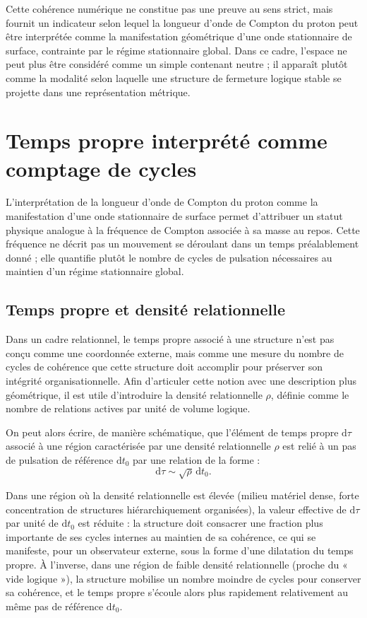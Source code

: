 \documentclass[11pt,a4paper]{article}
\begin{document}
Cette cohérence numérique ne constitue pas une preuve au sens strict, mais fournit un indicateur selon lequel la longueur d’onde de Compton du proton peut être interprétée comme la manifestation géométrique d’une onde stationnaire de surface, contrainte par le régime stationnaire global. Dans ce cadre, l’espace ne peut plus être considéré comme un simple contenant neutre ; il apparaît plutôt comme la modalité selon laquelle une structure de fermeture logique stable se projette dans une représentation métrique.

\section{Temps propre interprété comme comptage de cycles}

L’interprétation de la longueur d’onde de Compton du proton comme la manifestation d’une onde stationnaire de surface permet d’attribuer un statut physique analogue à la fréquence de Compton associée à sa masse au repos. Cette fréquence ne décrit pas un mouvement se déroulant dans un temps préalablement donné ; elle quantifie plutôt le nombre de cycles de pulsation nécessaires au maintien d’un régime stationnaire global.

\subsection{Temps propre et densité relationnelle}

Dans un cadre relationnel, le temps propre associé à une structure n’est pas conçu comme une coordonnée externe, mais comme une mesure du nombre de cycles de cohérence que cette structure doit accomplir pour préserver son intégrité organisationnelle. Afin d’articuler cette notion avec une description plus géométrique, il est utile d’introduire la densité relationnelle \(\rho\), définie comme le nombre de relations actives par unité de volume logique.

On peut alors écrire, de manière schématique, que l’élément de temps propre \(\mathrm{d}\tau\) associé à une région caractérisée par une densité relationnelle \(\rho\) est relié à un pas de pulsation de référence \(\mathrm{d}t_0\) par une relation de la forme :
\[
\mathrm{d}\tau \sim \sqrt{\rho}\,\mathrm{d}t_0.
\]

Dans une région où la densité relationnelle est élevée (milieu matériel dense, forte concentration de structures hiérarchiquement organisées), la valeur effective de \(\mathrm{d}\tau\) par unité de \(\mathrm{d}t_0\) est réduite : la structure doit consacrer une fraction plus importante de ses cycles internes au maintien de sa cohérence, ce qui se manifeste, pour un observateur externe, sous la forme d’une dilatation du temps propre. À l’inverse, dans une région de faible densité relationnelle (proche du « vide logique »), la structure mobilise un nombre moindre de cycles pour conserver sa cohérence, et le temps propre s’écoule alors plus rapidement relativement au même pas de référence \(\mathrm{d}t_0\).
\end{document}
